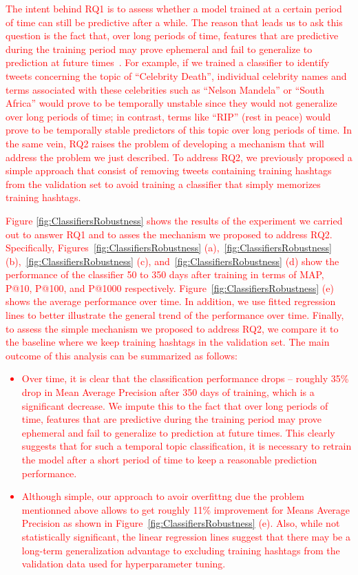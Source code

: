 \textcolor{red}{The intent behind RQ1 is to assess whether a model trained at a certain period of time can still be predictive after a while. The reason that leads us to ask this question is the fact that, over long periods of time, features that are predictive during the training period may prove ephemeral and fail to generalize to prediction at future times~\cite{Wang2019}. For example, if we trained a classifier to identify tweets concerning the topic of “Celebrity Death”, individual celebrity names and terms associated with these celebrities such as “Nelson Mandela” or “South Africa” would prove to be temporally unstable since they would not generalize over long periods of time; in contrast, terms like “RIP” (rest in peace) would prove to be temporally stable predictors of this topic over long periods of time. In the same vein, RQ2 raises the problem of developing a mechanism that will address the problem we just described. To address RQ2, we previously proposed a simple approach that consist of removing tweets containing training hashtags from the validation set to avoid training a classifier that simply memorizes training hashtags.}

\textcolor{red}{Figure \ref{fig:ClassifiersRobustness} shows the results of the experiment we carried out to answer RQ1 and to asses the mechanism we proposed to address RQ2. Specifically, Figures~\ref{fig:ClassifiersRobustness} (a),~\ref{fig:ClassifiersRobustness} (b),~\ref{fig:ClassifiersRobustness} (c), and~\ref{fig:ClassifiersRobustness} (d) show the performance of the classifier 50 to 350 days after training in terms of MAP, P@10, P@100, and P@1000 respectively. Figure~\ref{fig:ClassifiersRobustness} (e) shows the average performance over time.
In addition, we use fitted regression lines to better illustrate the general trend of the performance over time. Finally, to assess the simple mechanism we proposed to address RQ2, we compare it to the baseline where we keep training hashtags in the validation set. The main outcome of this analysis can be summarized as follows:
}
\textcolor{red}{
\begin{itemize}
    \item Over time,  it is clear that the classification performance drops -- roughly 35\% drop in Mean Average Precision after 350 days of training, which is a significant decrease. We impute this  to the fact that over long periods of time, features that are predictive during the training period may  prove ephemeral and fail to generalize to prediction at future times. This clearly suggests that for such a temporal topic classification, it is necessary to retrain the model after a short period of time to keep a reasonable prediction performance.
    \item Although simple, our approach to avoir overfittng due the problem mentionned above  allows to get roughly 11\% improvement for Means Average  Precision as shown in Figure~\ref{fig:ClassifiersRobustness} (e). Also, while not statistically significant, the linear regression lines suggest that there may be a long-term generalization advantage to excluding training hashtags from the validation data used for hyperparameter tuning.
\end{itemize}
}

